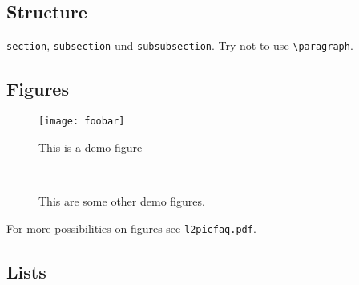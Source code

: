 \documentclass[a4paper,fontsize=12pt,toc=bib]{scrartcl}
\begin{document}

\subsection{Structure}

\texttt{section}, \texttt{subsection} und \texttt{subsubsection}. Try not to use \verb|\paragraph|.

\subsection{Figures}

\begin{figure}[h]
    \centering
    \texttt{[image: foobar]} %
    \caption{This is a demo figure}
    \label{fig:demo1}
\end{figure}

\begin{figure}[h]
    \centering
    \hspace{0.2cm}
    \\
    \hspace{0.2cm}
    \caption{This are some other demo figures.}
    \label{fig:demo2-5}
\end{figure}

For more possibilities on figures see \texttt{l2picfaq.pdf}.

\subsection{Lists}
\end{document}
